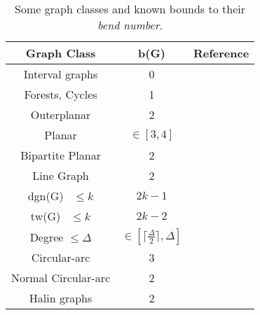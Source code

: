 \begin{table}[h]
\caption{Some graph classes and  known bounds to their \textit{bend number}.}
\label{tab:limitesBenNumber}
\begin{center}
\begin{tabular}{|c|c|c|}
\hline 
Graph Class & b(G) & Reference \\ 
\hline \hline  
Interval graphs & 0 & \cite{golumbic2009} \\ 
\hline 
Forests, Cycles & 1 & \cite{golumbic2013} \\ 
\hline 
Outerplanar &  2 & \cite{daniel2014b} \\ 
\hline 
Planar & $\in [3, 4]$ & \cite{daniel2014b}\\ 
\hline  
  Bipartite Planar & 2 & \cite{biedl2010} \\ 
\hline 
Line Graph & 2 & \cite{biedl2010} \\ 
\hline 
dgn(G)~\footnotemark %
$\leq k$ & $2k-1$ & \cite{daniel2014b} \\ 
\hline 
tw(G)~\footnotemark%
$\leq k$ & $2k-2$ & \cite{daniel2014b} \\ 
\hline 
Degree $\leq \Delta$ & $ \in [	\lceil \frac{\Delta}{2}\rceil, \Delta ] $ & \cite{daniel2014b} \\ 
\hline 
Circular-arc & 3 & \cite{alcon2016} \\ 
\hline 
Normal Circular-arc & 2 & \cite{alcon2016} \\ 
\hline 
Halin graphs & 2 & \cite{mathew2016}  \\ 
\hline 
\end{tabular} 
\end{center}
\end{table}

